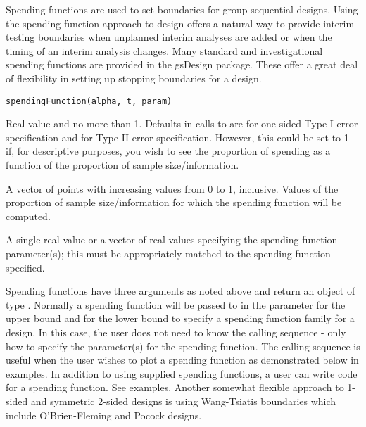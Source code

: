 \begin{Description}\relax
Spending functions are used to set boundaries for group sequential designs.
Using the spending function approach to design offers a natural way to provide interim testing boundaries
when unplanned interim analyses are added or when the timing of an interim analysis changes.
Many standard and investigational spending functions are provided in the gsDesign package.
These offer a great deal of flexibility in setting up stopping boundaries for a design.
\end{Description}
\begin{Usage}
\begin{verbatim}
spendingFunction(alpha, t, param)
\end{verbatim}
\end{Usage}
\begin{Arguments}
\begin{ldescription}
\item[\code{alpha}] Real value  and no more than 1. Defaults in calls to  are 
 for one-sided Type I error specification and 
 for Type II error specification. 
However, this could be set to 1 if, for descriptive purposes,
you wish to see the proportion of spending as a function of the proportion of sample size/information.
\item[\code{t}] A vector of points with increasing values from 0 to 1, inclusive. Values of the proportion of 
sample size/information for which the spending function will be computed.
\item[\code{param}] A single real value or a vector of real values specifying the spending function parameter(s); 
this must be appropriately matched to the spending function specified.
\end{ldescription}
\end{Arguments}
\begin{Details}\relax
Spending functions have three arguments as noted above and return an object of type .
Normally a spending function will be passed to  in the parameter  for the upper bound and
 for the lower bound to specify a spending function family for a design.
In this case, the user does not need to know the calling sequence - only how to specify the parameter(s) for the
spending function.
The calling sequence is useful when the user wishes to plot a spending function as demonstrated below
in examples.
In addition to using supplied spending functions, a user can write code for a spending function.
See examples.
Another somewhat flexible approach to 1-sided and symmetric 2-sided designs is using Wang-Tsiatis boundaries
which include O'Brien-Fleming and Pocock designs.
\end{Details}
